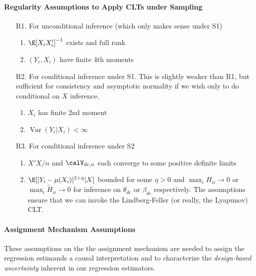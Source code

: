 \documentclass[12pt]{article}
\theoremstyle{plain}
\theoremstyle{definition}
\theoremstyle{remark}
\newcommand{\ra}{\rightarrow}
\newcommand{\Var}{\operatorname{Var}}
\begin{document}
\paragraph{Regularity Assumptions to Apply CLTs under Sampling}
\begin{enumerate}
  \item[R1.] For unconditional inference
    (which only makes sense under S1)
    \begin{enumerate}[label=(\roman*)]
      \item $\E[X_iX_i']^{-1}$ exists and full rank
      \item $(Y_i,X_i)$ have finite 4th moments
    \end{enumerate}
  \item[R2.] For conditional inference under S1.
    This is slightly weaker than R1, but sufficient for consistency and
    asymptotic normality if we wish only to do conditional on $X$
    inference.
    \begin{enumerate}[label=(\roman*)]
      \item $X_i$ has finite 2nd moment
      \item $\Var(Y_i|X_i)<\infty$
    \end{enumerate}
  \item[R3.] For conditional inference under S2
    \begin{enumerate}[label=(\roman*)]
      \item $X'X/n$ and $\calV_{dc,n}$ each converge to some positive
        definite limits
      \item $\E[|Y_i-\mu(X_i)|^{2+\eta}|X]$ bounded for some $\eta>0$
        and
        $\max_i H_{ii}\ra 0$ or $\max_i \tilde{H}_{ii}\ra 0$
        for inference on $\theta_{dc}$ or $\beta_{dc}$ respectively.
        The assumptions ensure that we can invoke the Lindberg-Feller
        (or really, the Lyapunov) CLT.
    \end{enumerate}
\end{enumerate}

\clearpage
\paragraph{Assignment Mechanism Assumptions}
These assumptions on the the assignment mechanism are needed to assign
the regression estimands a causal interpretation and to characterize the
\emph{design-based uncertainty} inherent in our regression estimators.
\end{document}
